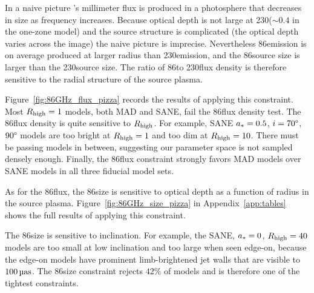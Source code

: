 

In a naive picture \sgra's millimeter flux is produced in a photosphere that decreases in size as frequency increases.
Because optical depth is not large at 230\GHz ($\sim 0.4$ in the one-zone model) and the source structure is complicated (the optical depth varies across the image) the naive picture is imprecise.
Nevertheless 86\GHz emission is on average produced at larger radius than 230\GHz emission, and the 86\GHz source size is larger than the 230\GHz source size.  The ratio of 86\GHz to 230\GHz flux density is therefore sensitive to the radial structure of the source plasma.

Figure~\ref{fig:86GHz_flux_pizza} records the results of applying this constraint.
Most $R_\mathrm{high} = 1$ models, both MAD and SANE, fail the 86\GHz flux density test.
The 86\GHz flux density is quite sensitive to $R_\mathrm{high}$.
For example, SANE $a_* = 0.5$, $i = 70\degree$, $90\degree$ models are too bright at $R_\mathrm{high} = 1$ and too dim at $R_\mathrm{high} = 10$.
There must be passing models in between, suggesting our parameter space is not sampled densely enough.
Finally, the 86\GHz flux constraint strongly favors MAD models over SANE models in all three fiducial model sets.


As for the 86\GHz flux, the 86\GHz size is sensitive to optical depth as a function of radius in the source plasma.
Figure~\ref{fig:86GHz_size_pizza} in Appendix~\ref{app:tables} shows the full results of applying this constraint.

The 86\GHz size is sensitive to inclination.
For example, the SANE, $a_* = 0$, $R_\mathrm{high} = 40$ models are too small at low inclination and too large when seen edge-on, because the edge-on models have prominent limb-brightened jet walls that are visible to $100\uas$.
The 86\GHz size constraint rejects $42\%$ of models and is therefore one of the tightest constraints.

